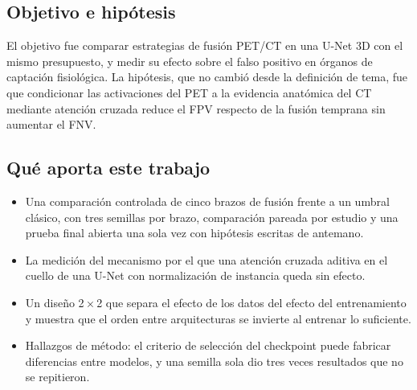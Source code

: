 \subsection{Objetivo e hipótesis}

El objetivo fue comparar estrategias de fusión PET/CT en una U-Net 3D con el mismo presupuesto, y medir su efecto sobre el falso positivo en órganos de captación fisiológica. La hipótesis, que no cambió desde la definición de tema, fue que condicionar las activaciones del PET a la evidencia anatómica del CT mediante atención cruzada reduce el FPV respecto de la fusión temprana sin aumentar el FNV.

\subsection{Qué aporta este trabajo}

\begin{itemize}
\item Una comparación controlada de cinco brazos de fusión frente a un umbral clásico, con tres semillas por brazo, comparación pareada por estudio y una prueba final abierta una sola vez con hipótesis escritas de antemano.
\item La medición del mecanismo por el que una atención cruzada aditiva en el cuello de una U-Net con normalización de instancia queda sin efecto.
\item Un diseño 2\,×\,2 que separa el efecto de los datos del efecto del entrenamiento y muestra que el orden entre arquitecturas se invierte al entrenar lo suficiente.
\item Hallazgos de método: el criterio de selección del checkpoint puede fabricar diferencias entre modelos, y una semilla sola dio tres veces resultados que no se repitieron.
\end{itemize}
